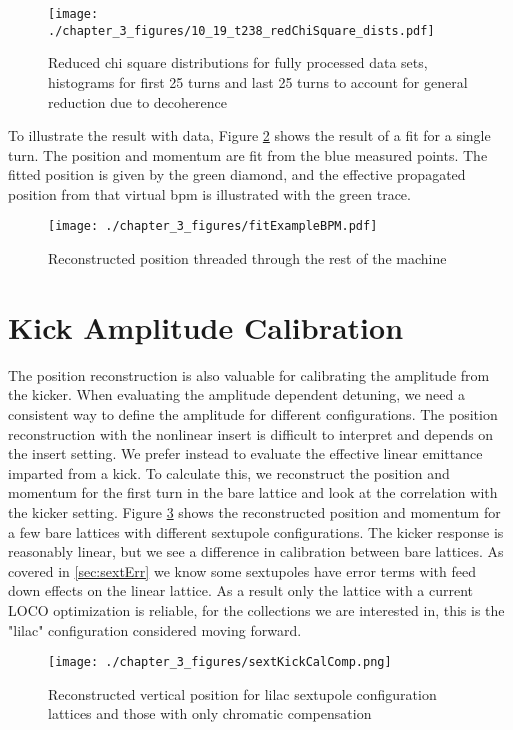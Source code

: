 \begin{figure}
    \centering
    \texttt{[image: ./chapter\_3\_figures/10\_19\_t238\_redChiSquare\_dists.pdf]}
    \caption{Reduced chi square distributions for fully processed data sets, histograms for first 25 turns and last 25 turns to account for general reduction due to decoherence}
    \label{fig:redChiDists}
\end{figure}

To illustrate the result with data, Figure \ref{fig:fitThread} shows the result of a fit for a single turn. The position and momentum are fit from the blue measured points. The fitted position is given by the green diamond, and the effective propagated position from that virtual bpm is illustrated with the green trace.

\begin{figure}
    \centering
    \texttt{[image: ./chapter\_3\_figures/fitExampleBPM.pdf]}
    \caption{Reconstructed position threaded through the rest of the machine}
    \label{fig:fitThread}
\end{figure}

\section{Kick Amplitude Calibration} \label{sec:kickAmpCal}
The position reconstruction is also valuable for calibrating the amplitude from the kicker. When evaluating the amplitude dependent detuning, we need a consistent way to define the amplitude for different configurations. The position reconstruction with the nonlinear insert is difficult to interpret and depends on the insert setting. We prefer instead to evaluate the effective linear emittance imparted from a kick. To calculate this, we reconstruct the position and momentum for the first turn in the bare lattice and look at the correlation with the kicker setting. Figure \ref{fig:kickCalLilacChrom} shows the reconstructed position and momentum for a few bare lattices with different sextupole configurations. The kicker response is reasonably linear, but we see a difference in calibration between bare lattices. As covered in \ref{sec:sextErr} we know some sextupoles have error terms with feed down effects on the linear lattice. As a result only the lattice with a current LOCO optimization is reliable, for the collections we are interested in, this is the "lilac" configuration considered moving forward.


\begin{figure}
    \centering
    \texttt{[image: ./chapter\_3\_figures/sextKickCalComp.png]}
    \caption{Reconstructed vertical position for lilac sextupole configuration lattices and those with only chromatic compensation}
    \label{fig:kickCalLilacChrom}
\end{figure}


